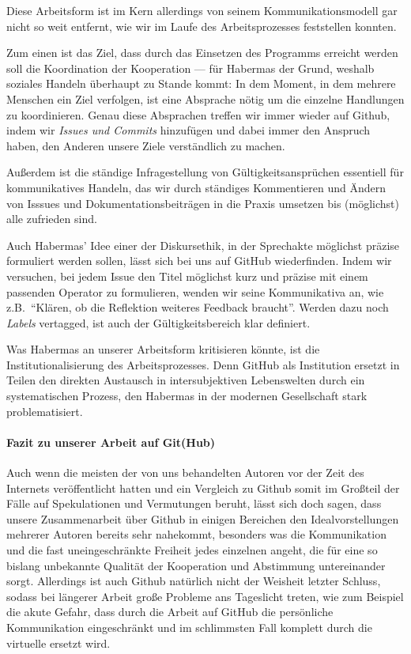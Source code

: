 Diese Arbeitsform ist im Kern allerdings von seinem Kommunikationsmodell gar nicht so weit entfernt, wie wir im Laufe des Arbeitsprozesses feststellen konnten.

Zum einen ist das Ziel, dass durch das Einsetzen des Programms erreicht werden soll die Koordination der Kooperation --- für Habermas der Grund, weshalb soziales Handeln überhaupt zu Stande kommt:
In dem Moment, in dem mehrere Menschen ein Ziel verfolgen, ist eine Absprache nötig um die einzelne Handlungen zu koordinieren.
Genau diese Absprachen treffen wir immer wieder auf Github, indem wir \emph{Issues und Commits} hinzufügen und dabei immer den Anspruch haben, den Anderen unsere Ziele verständlich zu machen.

Außerdem ist die ständige Infragestellung von Gültigkeitsansprüchen essentiell für kommunikatives Handeln, das wir durch ständiges Kommentieren und Ändern von Isssues und Dokumentationsbeiträgen in die Praxis umsetzen bis (möglichst) alle zufrieden sind.

Auch Habermas' Idee einer der Diskursethik, in der Sprechakte möglichst präzise formuliert werden sollen, lässt sich bei uns auf GitHub wiederfinden.
Indem wir versuchen, bei jedem Issue den Titel möglichst kurz und präzise mit einem passenden Operator zu formulieren, wenden wir seine Kommunikativa an, wie z.B.\ ``Klären, ob die Reflektion weiteres Feedback braucht''.
Werden dazu noch \emph{Labels} vertagged, ist auch der Gültigkeitsbereich klar definiert.

Was Habermas an unserer Arbeitsform kritisieren könnte, ist die Institutionalisierung des Arbeitsprozesses.
Denn GitHub als Institution ersetzt in Teilen den direkten Austausch in intersubjektiven Lebenswelten durch ein systematischen Prozess, den Habermas in der modernen Gesellschaft stark problematisiert.


\paragraph{Fazit zu unserer Arbeit auf Git(Hub)}

Auch wenn die meisten der von uns behandelten Autoren vor der Zeit des Internets veröffentlicht hatten und ein Vergleich zu Github somit im Großteil der Fälle auf Spekulationen und Vermutungen beruht, lässt sich doch sagen, dass unsere Zusammenarbeit über Github in einigen Bereichen den Idealvorstellungen mehrerer Autoren bereits sehr nahekommt, besonders was die Kommunikation und die fast uneingeschränkte Freiheit jedes einzelnen angeht, die für eine so bislang unbekannte Qualität der Kooperation und Abstimmung untereinander sorgt.
Allerdings ist auch Github natürlich nicht der Weisheit letzter Schluss, sodass bei längerer Arbeit große Probleme ans Tageslicht treten, wie zum Beispiel die akute Gefahr, dass durch die Arbeit auf GitHub die persönliche Kommunikation eingeschränkt und im schlimmsten Fall komplett durch die virtuelle ersetzt wird.
